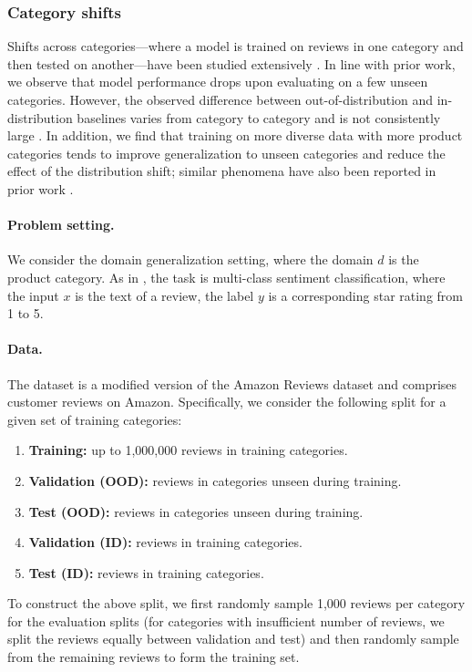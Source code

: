 \subsubsection{Category shifts}
Shifts across categories---where a model is trained on reviews in one category and then tested on another---have been studied extensively \citep{blitzer2007biographies,mansour2009dams,hendrycks2020pretrained}.
In line with prior work, we observe that model performance drops upon evaluating on a few unseen categories.
However, the observed difference between out-of-distribution and in-distribution baselines varies from category to category and is not consistently large \citep{hendrycks2020pretrained}.
In addition, we find that training on more diverse data with more product categories tends to improve generalization to unseen categories and reduce the effect of the distribution shift; similar phenomena have also been reported in prior work \citep{mansour2009dams,guo2018multi}.

\paragraph{Problem setting.}
We consider the domain generalization setting, where the domain $d$ is the product category.
As in \Amazon, the task is multi-class sentiment classification, where
the input $x$ is the text of a review, the label $y$ is a corresponding star rating from 1 to 5.

\paragraph{Data.}
The dataset is a modified version of the Amazon Reviews dataset \citep{ni2019justifying} and comprises customer reviews on Amazon.
Specifically, we consider the following split for a given set of training categories:
\begin{enumerate}
  \item \textbf{Training:} up to 1,000,000 reviews in training categories.
  \item \textbf{Validation (OOD):} reviews in categories unseen during training.
  \item \textbf{Test (OOD):} reviews in categories unseen during training.
  \item \textbf{Validation (ID):} reviews in training categories.
  \item \textbf{Test (ID):} reviews in training categories.
\end{enumerate}
To construct the above split, we first randomly sample 1,000 reviews per category for the evaluation splits (for categories with insufficient number of reviews, we split the reviews equally between validation and test) and then randomly sample from the remaining reviews to form the training set.

